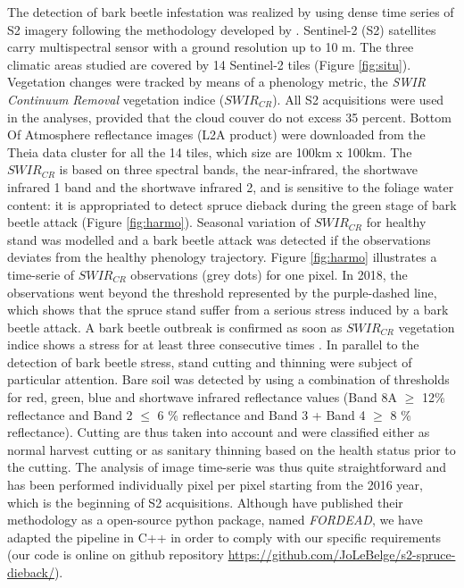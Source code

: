 \documentclass[3p,procedia]{elsarticle}
\begin{document}
The detection of bark beetle infestation was realized by using dense time series of S2 imagery following the methodology developed by \cite{dutrieux_package_2021}.
Sentinel-2 (S2) satellites carry multispectral sensor with a ground resolution up to 10 m.
The three climatic areas studied are covered by 14 Sentinel-2 tiles (Figure \ref{fig:situ}).  
Vegetation changes were tracked by means of a phenology metric, the \textit{SWIR Continuum Removal} vegetation indice ($SWIR_{CR}$).
All S2 acquisitions were used in the analyses, provided that the cloud couver do not excess 35 percent. 
Bottom Of Atmosphere reflectance images (L2A product) were downloaded from the Theia data cluster \citep{theia_team} for all the 14 tiles, which size are 100km x 100km.
The $SWIR_{CR}$ is based on three spectral bands, the near-infrared, the shortwave infrared 1 band and the shortwave infrared 2, and is sensitive to the foliage water content: it is appropriated to detect spruce dieback during the green stage of bark beetle attack (Figure \ref{fig:harmo}).
Seasonal variation of $SWIR_{CR}$ for healthy stand was modelled and a bark beetle attack was detected if the observations deviates from the healthy phenology trajectory. 
Figure \ref{fig:harmo} illustrates a time-serie of $SWIR_{CR}$ observations (grey dots) for one pixel. 
In 2018, the observations went beyond the threshold represented by the purple-dashed line, which shows that the spruce stand suffer from a serious stress induced by a bark beetle attack.
A bark beetle outbreak is confirmed as soon as $SWIR_{CR}$ vegetation indice shows a stress for at least three consecutive times \cite{dutrieux_package_2021}.
In parallel to the detection of bark beetle stress, stand cutting and thinning were subject of particular attention. 
Bare soil was detected by using a combination of thresholds for red, green, blue and shortwave infrared reflectance values (Band 8A $\geq$ 12\% reflectance and Band 2 $\leq$ 6 \% reflectance and Band 3 + Band 4 $\geq$ 8 \% reflectance).
Cutting are thus taken into account and were classified either as normal harvest cutting or as sanitary thinning based on the health status prior to the cutting.
The analysis of image time-serie was thus quite straightforward and has been performed individually pixel per pixel starting from the 2016 year, which is the beginning of S2 acquisitions. 
Although \cite{dutrieux_package_2021} have published their methodology as a open-source python package, named \textit{FORDEAD}, we have adapted the pipeline in C++ in order to comply with our specific requirements (our code is online on github repository \url{https://github.com/JoLeBelge/s2-spruce-dieback/}). 
\end{document}
